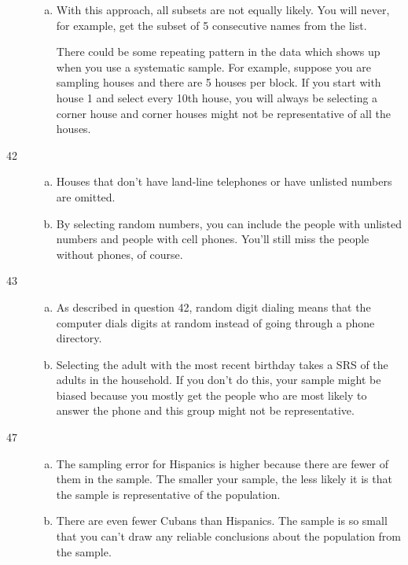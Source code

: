 \documentclass[letterpaper, landscape]{exam}
\begin{document}
\begin{description}
\begin{enumerate}[(a)]
          \item 
            With this approach, all subsets are not equally likely. You will
            never, for example, get the subset of 5 consecutive names from the
            list.
            
            There could be some repeating pattern in the data which shows up
            when you use a systematic sample.  For example, suppose you are
            sampling houses and there are 5 houses per block.  If you start with
            house 1 and select every 10th house, you will always be selecting a
            corner house and corner houses might not be representative of all
            the houses.
        \end{enumerate}

      \item[42]
        \begin{enumerate}[(a)]
          \item Houses that don't have land-line telephones or have unlisted
          numbers are omitted.

          \item By selecting random numbers, you can include the people with
          unlisted numbers and people with cell phones.  You'll still miss the
          people without phones, of course.

        \end{enumerate}

      \item[43]
        \begin{enumerate}[(a)]
          \item As described in question 42, random digit dialing means that the
            computer dials digits at random instead of going through a phone
            directory.

          \item Selecting the adult with the most recent birthday takes a SRS of
            the adults in the household.  If you don't do this, your sample
            might be biased because you mostly get the people who are most
            likely to answer the phone and this group might not be
            representative.
        \end{enumerate}

      \item[47]
        \begin{enumerate}[(a)]
          \item The sampling error for Hispanics is higher because there are
          fewer of them in the sample.  The smaller your sample, the less likely
          it is that the sample is representative of the population.

          \item There are even fewer Cubans than Hispanics. The sample is so
          small that you can't draw any reliable conclusions about the
          population from the sample.
        \end{enumerate}

  \end{description}
\end{document}
